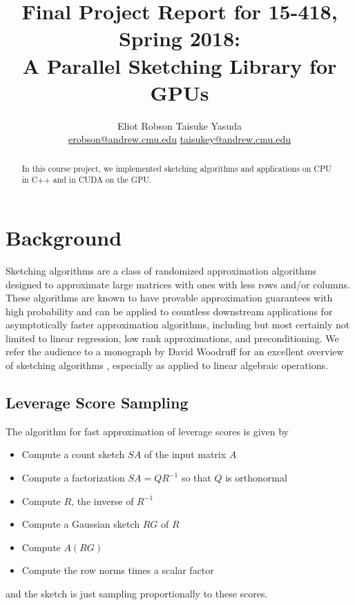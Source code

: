 \documentclass[12pt]{article}
\begin{document}
\title{
    \normalsize Final Project Report for 15-418, Spring 2018: \\
    \LARGE A Parallel Sketching Library for GPUs
}
\author{Eliot Robson \qquad Taisuke Yasuda\\ \small
\href{mailto:erobson@andrew.cmu.edu}{erobson@andrew.cmu.edu} \quad \href{mailto:taisukey@andrew.cmu.edu}{taisukey@andrew.cmu.edu}}

\maketitle

\begin{abstract}
	In this course project, we implemented sketching algorithms and applications on CPU in C++ and in CUDA on the GPU.
\end{abstract}

\section{Background}
Sketching algorithms are a class of randomized approximation algorithms designed to approximate large matrices with ones with less rows and/or columns. These algorithms are known to have provable approximation guarantees with high probability and can be applied to countless downstream applications for asymptotically faster approximation algorithms, including but most certainly not limited to linear regression, low rank approximations, and preconditioning. We refer the audience to a monograph by David Woodruff for an excellent overview of sketching algorithms \cite{woodruff2014sketching}, especially as applied to linear algebraic operations.

\subsection{Leverage Score Sampling}
The algorithm for fast approximation of leverage scores is given by
\begin{itemize}
	\item Compute a count sketch $SA$ of the input matrix $A$
	\item Compute a factorization $SA = QR^{-1}$ so that $Q$ is orthonormal
	\item Compute $R$, the inverse of $R^{-1}$
	\item Compute a Gaussian sketch $RG$ of $R$
	\item Compute $A(RG)$
	\item Compute the row norms times a scalar factor
\end{itemize}
and the sketch is just sampling proportionally to these scores. 
\end{document}

